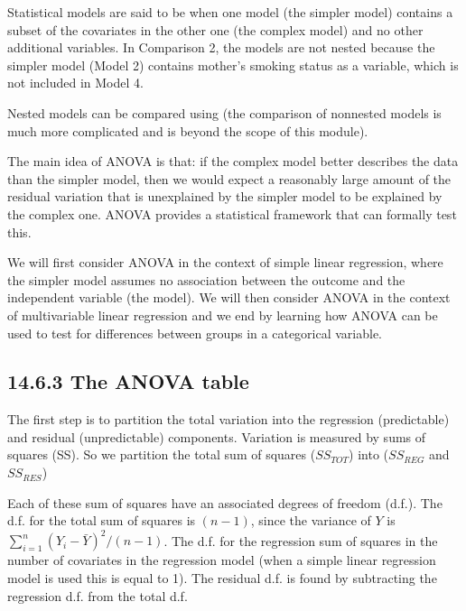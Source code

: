 \documentclass[letterpaper,10pt,english]{jupyterBook}
\begin{document}
\sphinxAtStartPar
Statistical models are said to be  when one model (the simpler model) contains a subset of the covariates in the other one (the complex model) and no other additional variables. In Comparison 2, the models are not nested because the simpler model (Model 2) contains mother’s smoking status as a variable, which is not included in Model 4.

\sphinxAtStartPar
Nested models can be compared using  (the comparison of non\sphinxhyphen{}nested models is much more complicated and is beyond the scope of this module).

\sphinxAtStartPar
The main idea of ANOVA is that: if the complex model better describes the data than the simpler model, then we would expect a reasonably large amount of the residual variation that is unexplained by the simpler model to be explained by the complex one. ANOVA provides a statistical framework that can formally test this.

\sphinxAtStartPar
We will first consider ANOVA in the context of simple linear regression, where the simpler model assumes no association between the outcome and the independent variable (the  model). We will then consider ANOVA in the context of multivariable linear regression and we end by learning how ANOVA can be used to test for differences between groups in a categorical variable.


\subsection{14.6.3 The ANOVA table}
\label{\detokenize{14.g. Linear Regression III:the-anova-table}}
\sphinxAtStartPar
{} The first step is to partition the total variation into the regression (predictable) and residual (unpredictable) components. Variation is measured by sums of squares (SS). So we partition the total sum of squares (\(SS_{TOT}\)) into  (\(SS_{REG}\) and \(SS_{RES}\))

\sphinxAtStartPar
{} Each of these sum of squares have an associated degrees of freedom (d.f.). The d.f. for the total sum of squares is \((n-1)\), since the variance of \(Y\) is \(\sum_{i=1}^n (Y_i-\bar{Y})^2/(n-1)\). The d.f. for the regression sum of squares in the number of covariates in the regression model (when a simple linear regression model is used this is equal to 1). The residual d.f. is found by subtracting the regression d.f. from the total d.f.
\end{document}
